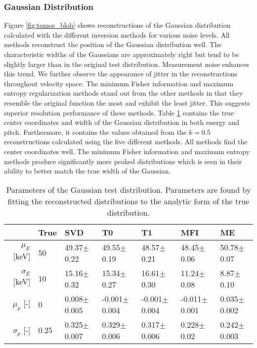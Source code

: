 \subsubsection{Gaussian Distribution}
Figure \ref{fig:tomos_blob} shows reconstructions of the Gaussian distribution calculated with the different inversion methods for various noise levels. 
All methods reconstruct the position of the Gaussian distribution well. The characteristic widths of the Gaussians are approximately right but tend to be slightly larger than in the original test distribution. Measurement noise enhances this trend. We further observe the appearance of jitter in the reconstructions throughout velocity space. 
The minimum Fisher information and maximum entropy regularization methods stand out from the other methods in that they resemble the original function the most and exhibit the least jitter. This suggests superior resolution performance of these methods. Table \ref{tab:synthetic_parameters_blob} contains the true center coordinates and width of the Gaussian distribution in both energy and pitch. Furthermore, it contains the values obtained from the $k=0.5$ reconstructions calculated using the five different methods. All methods find the center coordinates well. The minimum Fisher information and maximum entropy methods produce significantly more peaked distributions which is seen in their ability to better match the true width of the Gaussian. 
\begin{table}[h!]
    \caption{\label{tab:synthetic_parameters_blob} Parameters of the Gaussian test distribution. Parameters are found by fitting the reconstructed distributions to the analytic form of the true distribution.}
    \begin{tabular}{@{}r|llllll}
     & \textbf{True} & \textbf{SVD} & \textbf{T0} & \textbf{T1} & \textbf{MFI} & \textbf{ME} \\
    \hline\hline
    $\mu_E$ [keV] & 50 & 49.37$\pm$0.22 & 49.55$\pm$0.19 & 48.57$\pm$0.21 &  48.45$\pm$0.06 & 50.78$\pm$0.07 \\
    $\sigma_E$ [keV] & 10 & 15.16$\pm$0.32 & 15.34$\pm$0.27 & 16.61$\pm$0.30 & 11.24$\pm$0.08 & 8.87$\pm$0.10 \\
    $\mu_p$ [-] & 0 & 0.008$\pm$0.005 & -0.001$\pm$0.004 & -0.001$\pm$0.004 & -0.011$\pm$0.001 & 0.035$\pm$0.002 \\
    $\sigma_p$ [-] & 0.25 & 0.325$\pm$0.007 & 0.329$\pm$0.006 & 0.317$\pm$0.006 & 0.228$\pm$0.02 & 0.242$\pm$0.003 \\
    \hline
    \end{tabular}
\end{table}

